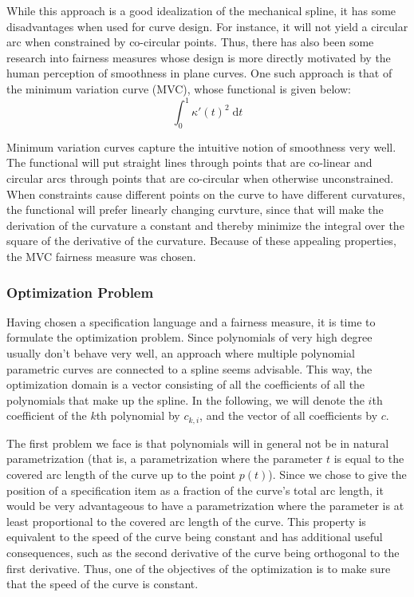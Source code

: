 \documentclass[a4paper]{article}
\newcommand{\apply}[2]{#1\!\left(#2\right)}
\begin{document}
				While this approach is a good idealization of the mechanical spline, it has some disadvantages when used for curve design. For instance, it will not yield a circular arc when constrained by co-circular points. Thus, there has also been some research into fairness measures whose design is more directly motivated by the human perception of smoothness in plane curves. One such approach is that of the minimum variation curve (MVC), whose functional is given below:
				\begin{displaymath}
					\int_{0}^{1}\apply{\kappa'}{t}^2\;\mathrm{d}t
				\end{displaymath}

				Minimum variation curves capture the intuitive notion of smoothness very well. The functional will put straight lines through points that are co-linear and circular arcs through points that are co-circular when otherwise unconstrained. When constraints cause different points on the curve to have different curvatures, the functional will prefer linearly changing curvture, since that will make the derivation of the curvature a constant and thereby minimize the integral over the square of the derivative of the curvature. Because of these appealing properties, the MVC fairness measure was chosen.

			\subsubsection{Optimization Problem}
			\label{section:optimization_problem}

				Having chosen a specification language and a fairness measure, it is time to formulate the optimization problem. Since polynomials of very high degree usually don't behave very well, an approach where multiple polynomial parametric curves are connected to a spline seems advisable. This way, the optimization domain is a vector consisting of all the coefficients of all the polynomials that make up the spline. In the following, we will denote the \(i\)th coefficient of the \(k\)th polynomial by \(c_{k,i}\), and the vector of all coefficients by \(c\).

				The first problem we face is that polynomials will in general not be in natural parametrization (that is, a parametrization where the parameter \(t\) is equal to the covered arc length of the curve up to the point \(\apply{p}{t}\)). Since we chose to give the position of a specification item as a fraction of the curve's total arc length, it would be very advantageous to have a parametrization where the parameter is at least proportional to the covered arc length of the curve. This property is equivalent to the speed of the curve being constant and has additional useful consequences, such as the second derivative of the curve being orthogonal to the first derivative. Thus, one of the objectives of the optimization is to make sure that the speed of the curve is constant.
\end{document}
